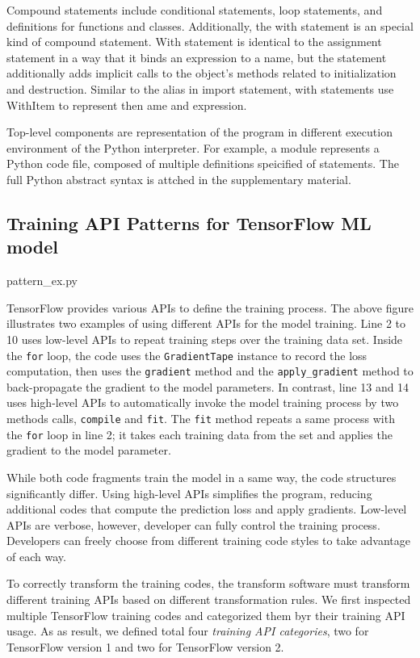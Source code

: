 Compound statements include conditional statements, loop statements,
and definitions for functions and classes.
Additionally, the with statement is an special kind of compound statement.
With statement is identical to the assignment statement 
in a way that it binds an expression to a name, 
but the statement additionally adds implicit calls
to the object's methods related to initialization and destruction.
Similar to the alias in import statement,
with statements use WithItem to represent then ame and expression.

Top-level components are representation of the program
in different execution environment of the Python interpreter.
For example, a module represents a Python code file, composed of
multiple definitions speicified of statements. 
The full Python abstract syntax is attched in the supplementary material.

\subsection{Training API Patterns for TensorFlow ML model}


{pattern_ex.py}

TensorFlow provides various APIs to define the training process.
The above figure illustrates two examples of using 
different APIs for the model training.
Line 2 to 10 uses low-level APIs to repeat training steps over the training
data set. Inside the {\tt for} loop, 
the code uses the {\tt GradientTape} instance to record the loss computation,
then uses the {\tt gradient} method and the {\tt apply\_gradient} method to
back-propagate the gradient to the model parameters.
In contrast, line 13 and 14 uses high-level APIs to automatically
invoke the model training process by two methods calls, {\tt compile} and
{\tt fit}. The {\tt fit} method repeats a same process with the {\tt for}
loop in line 2; it takes each training data from the set and
applies the gradient to the model parameter.

While both code fragments train the model in a same way, 
the code structures significantly differ.
Using high-level APIs simplifies the program,
reducing additional codes that compute the prediction loss and apply gradients.
Low-level APIs are verbose, however, developer can fully control
the training process.
Developers can freely choose from different training code styles to
take advantage of each way.

To correctly transform the training codes,
the transform software must transform different training APIs
based on different transformation rules. 
We first inspected multiple TensorFlow training codes and categorized them
byr their training API usage. 
As as result, we defined total four \textit{training API categories},
two for TensorFlow version 1 and two for TensorFlow version 2.

